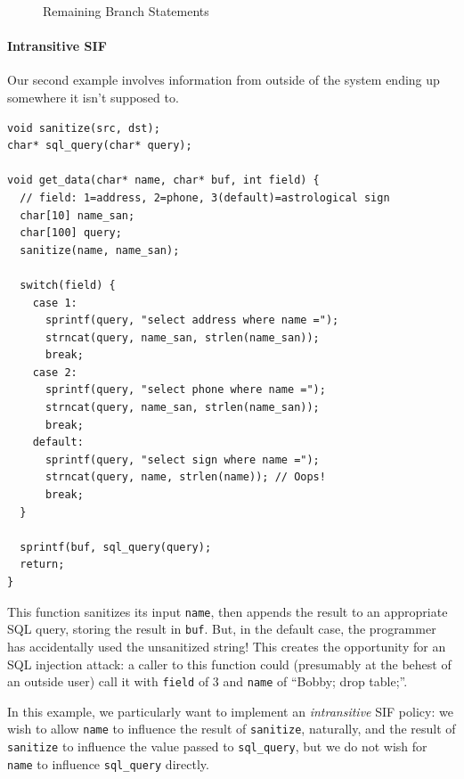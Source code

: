 \documentclass[acmsmall,review,anonymous]{acmart}\settopmatter{printfolios=true,printccs=false,printacmref=false}
\begin{document}
\begin{figure}
\begin{subfigure}{\textwidth}
  \end{subfigure}
  
  \caption{Remaining Branch Statements}
  \label{fig:rest}
\end{figure}

\paragraph*{Intransitive SIF}

Our second example involves information from outside of the system ending up somewhere it isn't supposed to.

\begin{verbatim}
void sanitize(src, dst);
char* sql_query(char* query);

void get_data(char* name, char* buf, int field) {
  // field: 1=address, 2=phone, 3(default)=astrological sign
  char[10] name_san;
  char[100] query;
  sanitize(name, name_san);

  switch(field) {
    case 1:
      sprintf(query, "select address where name =");
      strncat(query, name_san, strlen(name_san));
      break;
    case 2:
      sprintf(query, "select phone where name =");
      strncat(query, name_san, strlen(name_san));
      break;
    default:
      sprintf(query, "select sign where name =");
      strncat(query, name, strlen(name)); // Oops!
      break;
  }

  sprintf(buf, sql_query(query);
  return;
}
\end{verbatim}

This function sanitizes its input {\tt name}, then appends the result to an appropriate SQL
query, storing the result in {\tt buf}. But, in the default case, the programmer has accidentally
used the unsanitized string! This creates the opportunity for an SQL injection attack: a caller
to this function could (presumably at the behest of an outside user) call it with {\tt field} of
3 and {\tt name} of ``Bobby; drop table;''.

In this example, we particularly want to implement an {\it intransitive} SIF policy:
we wish to allow {\tt name} to influence the result of {\tt sanitize}, naturally, and the result
of {\tt sanitize} to influence the value passed to {\tt sql\_query}, but we do not wish for
{\tt name} to influence {\tt sql\_query} directly.
\end{document}
